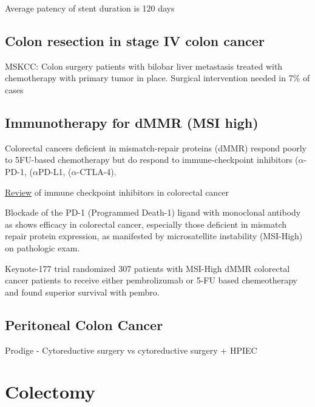 \documentclass[
]{book}
\begin{document}
Average patency of stent duration is 120 days

\hypertarget{colon-resection-in-stage-iv-colon-cancer}{%
\section{Colon resection in stage IV colon cancer}\label{colon-resection-in-stage-iv-colon-cancer}}

MSKCC: Colon surgery patients with bilobar liver metastasis treated with chemotherapy with primary tumor in place. Surgical intervention needed in 7\% of cases \citep{poultsides35}

\hypertarget{immunotherapy-for-dmmr-msi-high}{%
\section{Immunotherapy for dMMR (MSI high)}\label{immunotherapy-for-dmmr-msi-high}}

Colorectal cancers deficient in mismatch-repair proteins (dMMR) respond poorly to 5FU-based chemotherapy but do respond to immune-checkpoint inhibitors (\(\alpha\)-PD-1, (\(\alpha\)PD-L1, (\(\alpha\)-CTLA-4).

\href{https://www.frontiersin.org/articles/10.3389/fimmu.2022.795972/full}{Review} of immune checkpoint inhibitors in colorectal cancer

Blockade of the PD-1 (Programmed Death-1) ligand with monoclonal antibody as shows efficacy in colorectal cancer, especially those deficient in mismatch repair protein expression, as manifested by microsatellite instability (MSI-High) on pathologic exam.

Keynote-177 trial \citep{andre2207} randomized 307 patients with MSI-High dMMR colorectal cancer patients to receive either pembrolizumab or 5-FU based chemeotherapy and found superior survival with pembro.

\hypertarget{peritoneal-colon-cancer}{%
\section{Peritoneal Colon Cancer}\label{peritoneal-colon-cancer}}

Prodige - Cytoreductive surgery vs cytoreductive surgery + HPIEC

\hypertarget{colectomy-1}{%
\chapter{Colectomy}\label{colectomy-1}}
\end{document}
